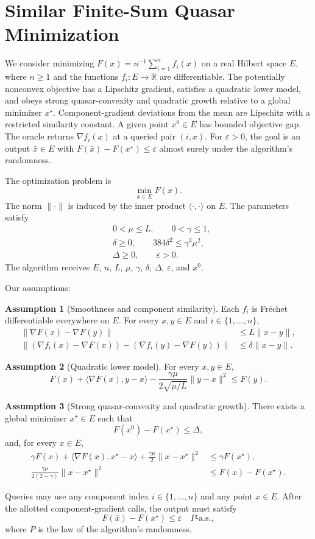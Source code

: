 \documentclass[10pt]{article}
\theoremstyle{definition}
\newtheorem{assumption}{Assumption}
\begin{document}
\section*{Similar Finite-Sum Quasar Minimization}
We consider minimizing $F(x)=n^{-1}\sum_{i=1}^n f_i(x)$ on a real Hilbert space $E$, where $n\geq 1$ and the functions $f_i:E\to\mathbb{R}$ are differentiable. The potentially nonconvex objective has a Lipschitz gradient, satisfies a quadratic lower model, and obeys strong quasar-convexity and quadratic growth relative to a global minimizer $x^\star$. Component-gradient deviations from the mean are Lipschitz with a restricted similarity constant. A given point $x^0\in E$ has bounded objective gap. The oracle returns $\nabla f_i(x)$ at a queried pair $(i,x)$. For $\varepsilon>0$, the goal is an output $\bar{x}\in E$ with $F(\bar{x})-F(x^\star)\leq\varepsilon$ almost surely under the algorithm's randomness.

The optimization problem is
\[
\min_{x\in E} F(x).
\]
The norm $\|\cdot\|$ is induced by the inner product $\langle\cdot,\cdot\rangle$ on $E$. The parameters satisfy
\[
\begin{aligned}
&0<\mu\leq L, \qquad 0<\gamma\leq 1,\\
&\delta\geq 0, \qquad 384\delta^2\leq\gamma^3\mu^2,\\
&\Delta\geq 0, \qquad \varepsilon>0.
\end{aligned}
\]
The algorithm receives $E$, $n$, $L$, $\mu$, $\gamma$, $\delta$, $\Delta$, $\varepsilon$, and $x^0$.

Our assumptions:
\begin{assumption}[Smoothness and component similarity]
Each $f_i$ is Fr\'echet differentiable everywhere on $E$. For every $x,y\in E$ and $i\in\{1,\ldots,n\}$,
\[
\begin{aligned}
\|\nabla F(x)-\nabla F(y)\|&\leq L\|x-y\|,\\
\| (\nabla f_i(x)-\nabla F(x))
-(\nabla f_i(y)-\nabla F(y))\|
&\leq\delta\|x-y\|.
\end{aligned}
\]
\end{assumption}

\begin{assumption}[Quadratic lower model]
For every $x,y\in E$,
\[
F(x)+\langle\nabla F(x),y-x\rangle
-\frac{\gamma\mu}{2\sqrt{\mu/L}}\|y-x\|^2
\leq F(y).
\]
\end{assumption}

\begin{assumption}[Strong quasar-convexity and quadratic growth]
There exists a global minimizer $x^\star\in E$ such that
\[
F(x^0)-F(x^\star)\leq\Delta,
\]
and, for every $x\in E$,
\[
\begin{aligned}
\gamma F(x)+\langle\nabla F(x),x^\star-x\rangle
+\frac{\gamma\mu}{2}\|x-x^\star\|^2
&\leq\gamma F(x^\star),\\
\frac{\gamma\mu}{2(2-\gamma)}\|x-x^\star\|^2
&\leq F(x)-F(x^\star).
\end{aligned}
\]
\end{assumption}

Queries may use any component index $i\in\{1,\ldots,n\}$ and any point $x\in E$. After the allotted component-gradient calls, the output must satisfy
\[
F(\bar{x})-F(x^\star)\leq\varepsilon
\quad P\text{-a.s.},
\]
where $P$ is the law of the algorithm's randomness.
\end{document}
